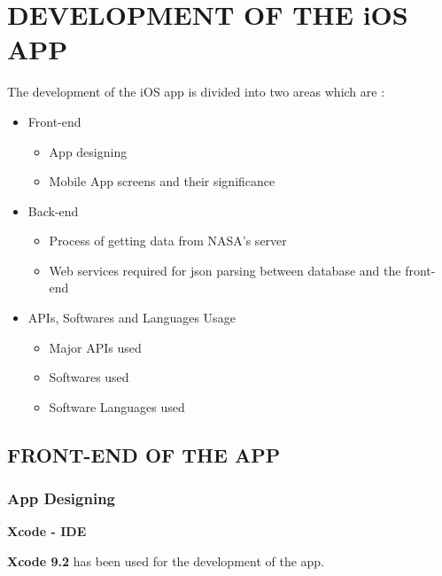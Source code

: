 \chapter{DEVELOPMENT OF THE iOS APP}
\label{chap:development of the app}

The development of the iOS app is divided into two areas which are :

\begin{itemize}
    \item Front-end
        \begin{itemize}
            \item App designing
            \item Mobile App screens and their significance \\
        \end{itemize}

    \item Back-end
        \begin{itemize}
            \item Process of getting data from NASA's server
            \item Web services required for \gls{json} parsing between database and the front-end \\
        \end{itemize}
    
     \item APIs, Softwares and Languages Usage
        \begin{itemize}
            \item Major APIs used
            \item Softwares used
            \item Software Languages used \\
        \end{itemize}    
\end{itemize}

\section{FRONT-END OF THE APP}

\subsection{App Designing}
    
\centerline{\textbf{Xcode - IDE}}

\centerline{\textbf{Xcode 9.2} has been used for the development of the app.}

